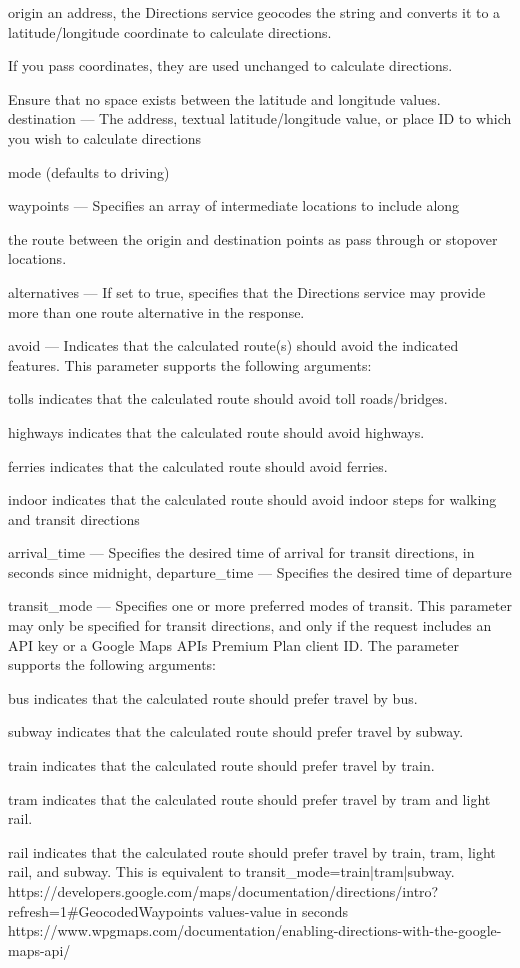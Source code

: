\documentclass{article}
\begin{document}
\item origin an address, the Directions service geocodes the string and converts it to a latitude/longitude coordinate to calculate directions.
\item If you pass coordinates, they are used unchanged to calculate directions. \item Ensure that no space exists between the latitude and longitude values.
destination — The address, textual latitude/longitude value, or place ID to which you wish to calculate directions
\item mode (defaults to driving)
\item waypoints — Specifies an array of intermediate locations to include along \item the route between the origin and destination points as pass through or stopover locations. 
\item alternatives — If set to true, specifies that the Directions service may provide more than one route alternative in the response. 
\item avoid — Indicates that the calculated route(s) should avoid the indicated features. This parameter supports the following arguments:
\item \item tolls indicates that the calculated route should avoid toll roads/bridges.
\item \item highways indicates that the calculated route should avoid highways.
\item \item ferries indicates that the calculated route should avoid ferries.
\item \item indoor indicates that the calculated route should avoid indoor steps for walking and transit directions
\item arrival_time — Specifies the desired time of arrival for transit directions, in seconds since midnight, departure_time — Specifies the desired time of departure
\item transit_mode — Specifies one or more preferred modes of transit. This parameter may only be specified for transit directions, and only if the request includes an API key or a Google Maps APIs Premium Plan client ID. The parameter supports the following arguments:
\item bus indicates that the calculated route should prefer travel by bus.
\item subway indicates that the calculated route should prefer travel by subway.
\item train indicates that the calculated route should prefer travel by train.
\item tram indicates that the calculated route should prefer travel by tram and light rail.
\item rail indicates that the calculated route should prefer travel by train, tram, light rail, and subway. This is equivalent to transit_mode=train|tram|subway.
https://developers.google.com/maps/documentation/directions/intro?refresh=1#GeocodedWaypoints
values-value in seconds
https://www.wpgmaps.com/documentation/enabling-directions-with-the-google-maps-api/
\end{document}
